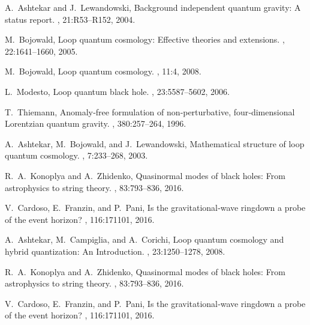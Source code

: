 \documentclass[11pt]{article}
\begin{document}

\begin{thebibliography}{9}

A.~Ashtekar and J.~Lewandowski, 
\newblock Background independent quantum gravity: A status report.
, 21:R53–R152, 2004.

M.~Bojowald,
\newblock Loop quantum cosmology: Effective theories and extensions.
, 22:1641–1660, 2005.

M.~Bojowald,
\newblock Loop quantum cosmology.
, 11:4, 2008.

L.~Modesto,
\newblock Loop quantum black hole.
, 23:5587–5602, 2006.

T.~Thiemann,
\newblock Anomaly‐free formulation of non‐perturbative, four‐dimensional Lorentzian quantum gravity.
, 380:257–264, 1996.

A.~Ashtekar, M.~Bojowald, and J.~Lewandowski,
\newblock Mathematical structure of loop quantum cosmology.
, 7:233–268, 2003.

R.~A.~Konoplya and A.~Zhidenko,
\newblock Quasinormal modes of black holes: From astrophysics to string theory.
, 83:793–836, 2016.

V.~Cardoso, E.~Franzin, and P.~Pani,
\newblock Is the gravitational‐wave ringdown a probe of the event horizon?
, 116:171101, 2016.

A.~Ashtekar, M.~Campiglia, and A.~Corichi,
\newblock Loop quantum cosmology and hybrid quantization: An Introduction.
, 23:1250–1278, 2008.

R.~A.~Konoplya and A.~Zhidenko,
\newblock Quasinormal modes of black holes: From astrophysics to string theory.
, 83:793–836, 2016.

V.~Cardoso, E.~Franzin, and P.~Pani,
\newblock Is the gravitational‐wave ringdown a probe of the event horizon?
, 116:171101, 2016.


\end{thebibliography}
\end{document}
